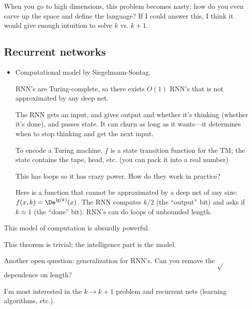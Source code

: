 When you go to high dimensions, this problem becomes nasty: how do you even carve up the space and define the language? If I could answer this, I think it would give enough intuition to solve $k$ vs. $k+1$.

\subsection{Recurrent networks}



\begin{itemize}
\item
Computational model by Siegelmann-Sontag.

RNN's are Turing-complete, so there exists $O(1)$ RNN's  that is not approximated by any deep net.


The RNN gets an input, and gives output and whether it's thinking (whether it's done), and passes state. It can churn as long as it wants---it determines when to stop thinking and get the next input.

To encode a Turing machine, $f$ is a state transition function for the TM; the state contains the tape, head, etc. (you can pack it into a real number)

This has loops so it has crazy power. How do they work in practice?

Here is a function that cannot be approximated by a deep net of any size: $f(x,k) = \De^{\lg(k)}(x)$. The RNN computes $k/2$ (the ``output'' bit) and asks if $k\approx 1$ (the ``done'' bit). RNN's can do loops of unbounded length.
\end{itemize}
This model of computation is absurdly powerful. 

This theorem is trivial; the intelligence part is the model.

Another open question: generalization for RNN's. Can you remove the $\sqrt{}$ dependence on length?

I'm most interested in the $k\to k+1$ problem and recurrent nets (learning algorithms, etc.).